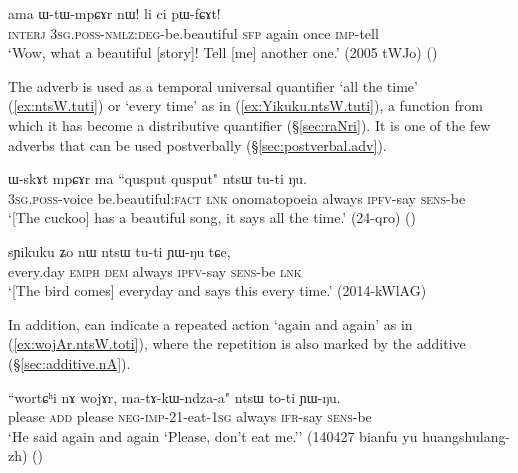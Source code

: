 \begin{exe}
\ex \label{ex:lici.pWfCAt}
\gll ama ɯ-tɯ-mpɕɤr nɯ! li ci pɯ-fɕɤt! \\
\textsc{interj} \textsc{3sg}.\textsc{poss}-\textsc{nmlz}:\textsc{deg}-be.beautiful \textsc{sfp} again once \textsc{imp}-tell \\
\glt `Wow, what a beautiful [story]! Tell [me] another one.' (2005 tWJo)
()
\end{exe}
 
 The adverb  is used as a temporal universal quantifier `all the time' (\ref{ex:ntsW.tuti}) or `every time' as in (\ref{ex:Yikuku.ntsW.tuti}), a function from which it has become a distributive quantifier (§\ref{sec:raNri}). It is one of the few adverbs that can be used postverbally (§\ref{sec:postverbal.adv}).

\begin{exe}
\ex \label{ex:ntsW.tuti}
\gll  ɯ-skɤt mpɕɤr ma {``qusput qusput"} ntsɯ tu-ti ŋu. \\
\textsc{3sg}.\textsc{poss}-voice be.beautiful:\textsc{fact} \textsc{lnk} onomatopoeia always \textsc{ipfv}-say \textsc{sens}-be \\
\glt `[The cuckoo] has a beautiful song, it says  all the time.' (24-qro)
()
 \end{exe} 
 
\begin{exe}
\ex \label{ex:Yikuku.ntsW.tuti}
\gll   sɲikuku ʑo nɯ ntsɯ tu-ti ɲɯ-ŋu tɕe, \\
every.day \textsc{emph} \textsc{dem} always \textsc{ipfv}-say \textsc{sens}-be \textsc{lnk} \\
\glt `[The bird comes] everyday and says this every time.'  (2014-kWlAG)
 \end{exe}
 
In addition,  can indicate a repeated action `again and again' as in (\ref{ex:wojAr.ntsW.toti}), where the repetition is also marked by the additive  (§\ref{sec:additive.nA}).

\begin{exe}
\ex \label{ex:wojAr.ntsW.toti}
\gll ``wortɕʰi nɤ wojɤr, ma-tɤ-kɯ-ndza-a" ntsɯ to-ti ɲɯ-ŋu. \\
please \textsc{add} please \textsc{neg}-\textsc{imp}-2\fl{}1-eat-\textsc{1sg} always \textsc{ifr}-say \textsc{sens}-be \\
\glt `He said again and again `Please, don't eat me.'' (140427 bianfu yu huangshulang-zh)
()
\end{exe}

